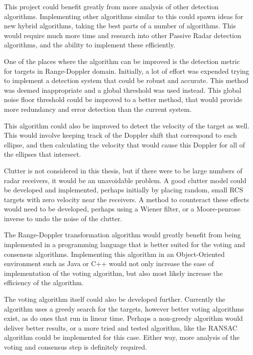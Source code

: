 \documentclass[12pt,openany,a4paper]{book}
\begin{document}
\bigskip

This project could benefit greatly from more analysis of other detection algorithms. Implementing other algorithms similar to this could spawn ideas for new hybrid algorithms, taking the best parts of a number of algorithms. This would require much more time and research into other Passive Radar detection algorithms, and the ability to implement these efficiently.

\bigskip

One of the places where the algorithm can be improved is the detection metric for targets in Range-Doppler domain. Initially, a lot of effort was expended trying to implement a detection system that could be robust and accurate. This method was deemed inappropriate and a global threshold was used instead. This global noise floor threshold could be improved to a better method, that would provide more redundancy and error detection than the current system. 

\bigskip

This algorithm could also be improved to detect the velocity of the target as well. This would involve keeping track of the Doppler shift that correspond to each ellipse, and then calculating the velocity that would cause this Doppler for all of the ellipses that intersect.

\bigskip

Clutter is not considered in this thesis, but if there were to be large numbers of radar receivers, it would be an unavoidable problem. A good clutter model could be developed and implemented, perhaps initially by placing random, small RCS targets with zero velocity near the receivers. A method to counteract these effects would need to be developed, perhaps using a Wiener filter, or a Moore-penrose inverse to undo the noise of the clutter.

\bigskip

The Range-Doppler transformation algorithm would greatly benefit from being implemented in a programming language that is better suited for the voting and consensus algorithms. Implementing this algorithm in an Object-Oriented environment such as Java or C++ would not only increase the ease of implementation of the voting algorithm, but also most likely increase the efficiency of the algorithm.

\bigskip

The voting algorithm itself could also be developed further. Currently the algorithm uses a greedy search for the targets, however better voting algorithms exist, as do ones that run in linear time. Perhaps a non-greedy algorithm would deliver better results, or a more tried and tested algorithm, like the RANSAC algorithm could be implemented for this case. Either way, more analysis of the voting and consensus step is definitely required.
\end{document}
